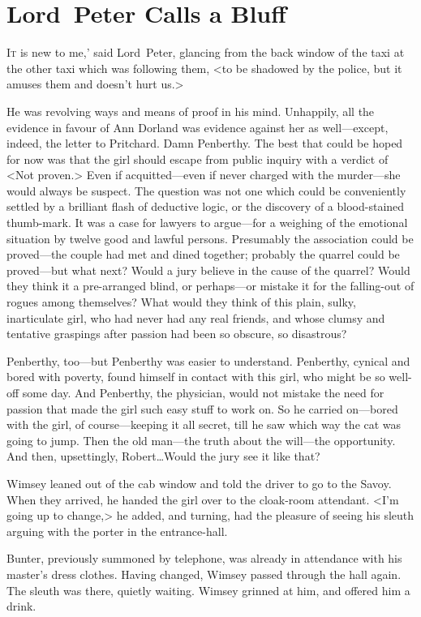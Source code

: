 \chapter{Lord~Peter Calls a Bluff}

\lettrine[ante=‘]{I}{t} is new to me,' said Lord~Peter, glancing from the back window of the taxi at the other taxi which was following them, <to be shadowed by the police, but it amuses them and doesn't hurt us.>

\zz
He was revolving ways and means of proof in his mind. Unhappily, all the evidence in favour of Ann Dorland was evidence against her as well—except, indeed, the letter to Pritchard. Damn Penberthy. The best that could be hoped for now was that the girl should escape from public inquiry with a verdict of <Not proven.> Even if acquitted—even if never charged with the murder—she would always be suspect. The question was not one which could be conveniently settled by a brilliant flash of deductive logic, or the discovery of a blood-stained thumb-mark. It was a case for lawyers to argue—for a weighing of the emotional situation by twelve good and lawful persons. Presumably the association could be proved—the couple had met and dined together; probably the quarrel could be proved—but what next? Would a jury believe in the cause of the quarrel? Would they think it a pre-arranged blind, or perhaps—or mistake it for the falling-out of rogues among themselves? What would they think of this plain, sulky, inarticulate girl, who had never had any real friends, and whose clumsy and tentative graspings after passion had been so obscure, so disastrous?

Penberthy, too—but Penberthy was easier to understand. Penberthy, cynical and bored with poverty, found himself in contact with this girl, who might be so well-off some day. And Penberthy, the physician, would not mistake the need for passion that made the girl such easy stuff to work on. So he carried on—bored with the girl, of course—keeping it all secret, till he saw which way the cat was going to jump. Then the old man—the truth about the will—the opportunity. And then, upsettingly, Robert\dots Would the jury see it like that?

Wimsey leaned out of the cab window and told the driver to go to the Savoy. When they arrived, he handed the girl over to the cloak-room attendant. <I'm going up to change,> he added, and turning, had the pleasure of seeing his sleuth arguing with the porter in the entrance-hall.

Bunter, previously summoned by telephone, was already in attendance with his master's dress clothes. Having changed, Wimsey passed through the hall again. The sleuth was there, quietly waiting. Wimsey grinned at him, and offered him a drink.

